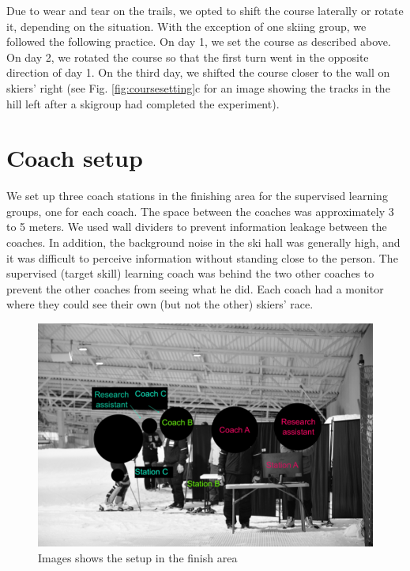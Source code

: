 \documentclass[pdflatex,sn-nature]{sn-jnl}%
\theoremstyle{thmstyleone}%
\theoremstyle{thmstyletwo}%
\theoremstyle{thmstylethree}%
\begin{document}
\begin{appendices}
Due to wear and tear on the trails, we opted to shift the course laterally or rotate it, depending on the situation. With the exception of one skiing group, we followed the following practice. On day 1, we set the course as described above. On day 2, we rotated the course so that the first turn went in the opposite direction of day 1. On the third day, we shifted the course closer to the wall on skiers' right (see Fig. \ref{fig:coursesetting}c for an image showing the tracks in the hill left after a skigroup had completed the experiment). 


\section{Coach setup}
We set up three coach stations in the finishing area for the supervised learning groups, one for each coach. The space between the coaches was approximately 3 to 5 meters. We used wall dividers to prevent information leakage between the coaches. In addition, the background noise in the ski hall was generally high, and it was difficult to perceive information without standing close to the person. The supervised (target skill) learning coach was behind the two other coaches to prevent the other coaches from seeing what he did. Each coach had a monitor where they could see their own (but not the other) skiers' race.

\begin{figure}[H]
\centering
\includegraphics[width=\linewidth]{figures/figure_stations3.jpg}
\caption{Images shows the setup in the finish area
}
\label{fig:coachstation}
\end{figure}
 





\end{appendices}
\end{document}
